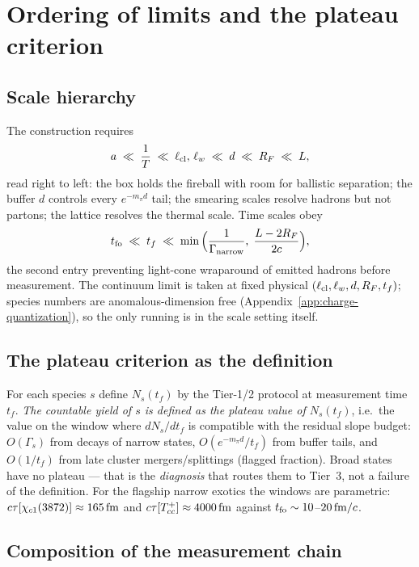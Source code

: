 \section{Ordering of limits and the plateau criterion}
\label{app:limits}

\subsection{Scale hierarchy}

The construction requires
\begin{equation}
a \;\ll\; \frac1T \;\ll\; \ell_{\rm cl},\,\ell_w \;\ll\; d \;\ll\; R_F
\;\ll\; L,
\end{equation}
read right to left: the box holds the fireball with room for ballistic
separation; the buffer $d$ controls every $e^{-m_\pi d}$ tail; the
smearing scales resolve hadrons but not partons; the lattice resolves
the thermal scale.  Time scales obey
\begin{equation}
t_{\rm fo} \;\ll\; t_f \;\ll\;
\min\Big(\frac{1}{\Gamma_{\rm narrow}},\; \frac{L-2R_F}{2c}\Big),
\end{equation}
the second entry preventing light-cone wraparound of emitted hadrons
before measurement.  The continuum limit is taken at fixed physical
$(\ell_{\rm cl},\ell_w,d,R_F,t_f)$; species numbers are
anomalous-dimension free (Appendix~\ref{app:charge-quantization}), so
the only running is in the scale setting itself.

\subsection{The plateau criterion as the definition}

For each species $s$ define $N_s(t_f)$ by the Tier-1/2 protocol at
measurement time $t_f$.  \emph{The countable yield of $s$ is defined as
the plateau value of $N_s(t_f)$}, i.e.\ the value on the window where
$dN_s/dt_f$ is compatible with the residual slope budget:
$O(\Gamma_s)$ from decays of narrow states, $O(e^{-m_\pi d}/t_f)$ from
buffer tails, and $O(1/t_f)$ from late cluster mergers/splittings
(flagged fraction).  Broad states have no plateau --- that is the
\emph{diagnosis} that routes them to Tier~3, not a failure of the
definition.  For the flagship narrow exotics the windows are parametric:
$c\tau[\chi_{c1}(3872)]\approx165\,\mathrm{fm}$ and $c\tau[T_{cc}^{+}]\approx4000\,\mathrm{fm}$ against
$t_{\rm fo}\sim10$--$20\,\mathrm{fm}/c$.

\subsection{Composition of the measurement chain}
\label{app:composition}

